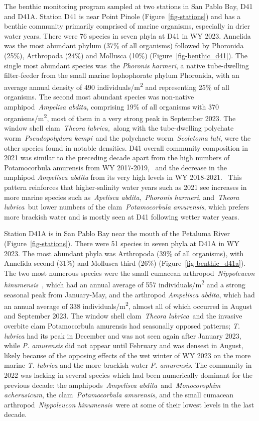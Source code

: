 \documentclass[
]{article}
\begin{document}
The benthic monitoring program sampled at two stations in San Pablo Bay,
D41 and D41A. Station D41 is near Point Pinole
(Figure~\ref{fig-stations}) and has a benthic community primarily
comprised of marine organisms, especially in drier water years. There
were 76 species in seven phyla at D41 in WY 2023. Annelida was the most
abundant phylum (37\% of all organisms) followed by Phoronida (25\%),
Arthropoda (24\%) and Mollusca (10\%) (Figure~\ref{fig-benthic_d41}).
The single most abundant species was~the \emph{Phoronis harmeri}, a
native tube-dwelling filter-feeder from the small marine lophophorate
phylum Phoronida, with an average annual density of 490
individuals/m\textsuperscript{2} and representing 25\% of all organisms.
The second most abundant species was non-native amphipod~\emph{Ampelisa
abdita}, comprising 19\% of all organisms with 370
organisms/m\textsuperscript{2}, most of them in a very strong peak in
September 2023. The window shell clam~\emph{Theora lubrica,}~along with
the tube-dwelling polychate worm~\emph{Pseudopolydora kempi}~and the
polychaete worm~\emph{Scoletoma luti}, were the other species found in
notable densities. D41 overall community composition in 2021 was similar
to the preceding decade apart from the high numbers of Potamocorbula
amurensis from WY 2017-2019,~ and the decrease in the amphipod
\emph{Ampelisca abdita} from its very high levels in WY 2018-2021.~ This
pattern reinforces that higher-salinity water years such as 2021 see
increases in more marine species such as~\emph{Apelisca
abdita},~\emph{Phoronis harmeri}, and~\emph{Theora lubrica}~but lower
numbers of the clam~\emph{Potamocorbula amurensis}, which prefers more
brackish water and is mostly seen at D41 following wetter water years.

Station D41A is in San Pablo Bay near the mouth of the Petaluma River
(Figure~\ref{fig-stations}). There were 51 species in seven phyla at
D41A in WY 2023. The most abundant phyla was Arthropoda (39\% of all
organisms), with Annelida second (31\%) and Mollusca third (26\%)
(Figure~\ref{fig-benthic_d41a}). The two most numerous species were the
small cumacean arthropod~\emph{Nippoleucon hinumensis}~, which had an
annual average of 557 individuals/m\textsuperscript{2} and a strong
seasonal peak from January-May, and the arthropod \emph{Ampelisca
abdita}, which had an annual average of 338
individuals/m\textsuperscript{2}, almost all of which occurred in August
and September 2023. The window shell clam~\emph{Theora lubrica}~and the
invasive overbite clam Potamocorbula amurensis had seasonally opposed
patterns; \emph{T. lubrica} had its peak in December and was not seen
again after January 2023, while \emph{P. amurensis} did not appear until
February and was densest in August, likely because of the opposing
effects of the wet winter of WY 2023 on the more marine \emph{T.
lubrica} and the more brackish-water \emph{P. amurensis}. The community
in 2022 was lacking in several species which had been numerically
dominant for the previous decade: the amphipods~\emph{Ampelisca
abdita}~and~\emph{Monocorophim acherusicum}, the
clam~\emph{Potamocorbula amurensis}, and the small cumacean
arthropod~\emph{Nippoleucon hinumensis}~were at some of their lowest
levels in the last decade.
\end{document}
